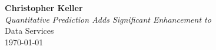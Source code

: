 \begin{titlepage}
	\vspace*{\fill}
	\begin{center}
		\textbf{\huge Christopher Keller}\\[1cm]
        \textit{Quantitative Prediction Adds Significant Enhancement to \climatedge}\\ [.5cm]
		\normalsize Data Services\\ [.5cm]
        \normalsize \today
	\end{center}
	\vspace*{\fill}
\end{titlepage}
